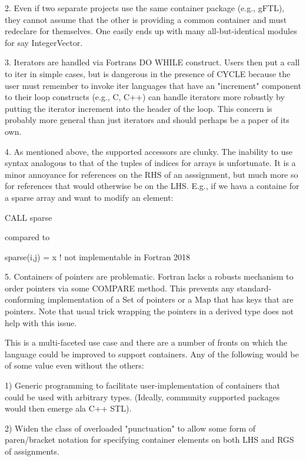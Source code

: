 \documentclass{article}
\begin{document}
2. Even if two separate projects use the same container package (e.g.,
   gFTL), they cannot assume that the other is providing a common
   container and must redeclare for themselves.  One easily ends up
   with many all-but-identical modules for say IntegerVector.

3. Iterators are handled via Fortrans DO WHILE construct.  Users then
   put a call to iter%
   in simple cases, but is dangerous in the presence of CYCLE because
   the user must remember to invoke iter%
   languages that have an "increment" component to their loop
   constructs (e.g., C, C++) can handle iterators more robustly by
   putting the iterator increment into the header of the loop.  This
   concern is probably more general than just iterators and should
   perhaps be a paper of its own.

4. As mentioned above, the supported accessors are clunky.  The
   inability to use syntax analogous to that of the tuples of indices
   for arrays is unfortunate.  It is a minor annoyance for references
   on the RHS of an asssignment, but much more so for references that
   would otherwise be on the LHS.  E.g., if we hava a containe for a
   sparse array and want to modify an element:

      CALL sparse%

   compared to

      sparse(i,j) = x  ! not implementable in Fortran 2018

5. Containers of pointers are problematic.  Fortran lacks a robusts
   mechanism to order pointers via some COMPARE method.  This prevents
   any standard-conforming implementation of a Set of pointers or a
   Map that has keys that are pointers.  Note that usual trick wrapping the
   pointers in a derived type does not help with this issue.


This is a multi-faceted use case and there are a number of fronts on
which the language could be improved to support containers.  Any of
the following would be of some value even without the others:

1) Generic programming to facilitate user-implementation of
   containers that could be used with arbitrary types.  (Ideally,
   community supported packages would then emerge ala C++ STL).

2) Widen the class of overloaded "punctuation" to allow some form of
   paren/bracket notation for specifying container elements on both
   LHS and RGS of assignments.
\end{document}

